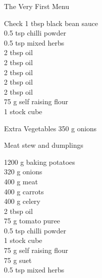 \begin{menu}{The Very First Menu}
      \par\vfil %
      \vfil\clearpage %
      \begin{shoppinglist}{Check}
      1 tbsp black bean sauce \\ 
      0.5 tsp chilli powder \\ 
      0.5 tsp mixed herbs \\ 
      2 tbsp oil \\ 
      2 tbsp oil \\ 
      2 tbsp oil \\ 
      2 tbsp oil \\ 
      2 tbsp oil \\ 
      75 g self raising flour \\ 
      1  stock cube \\ 
      \end{shoppinglist}%
      \begin{shoppinglist}{Extra Vegetables}
      350 g onions \\ 
      \end{shoppinglist}%
      \par\vfil %
    \vfil\clearpage
  
    \begin{recipe}{2}{Meat stew and dumplings}%
    
	
	
		\begin{ingredients}
		1200 g baking potatoes  \\
	320 g onions  \\
	400 g meat  \\
	400 g carrots  \\
	400 g celery  \\
	2 tbsp oil  \\
	75 g tomato puree  \\
	0.5 tsp chilli powder  \\
	1  stock cube  \\
	75 g self raising flour  \\
	75 g suet  \\
	0.5 tsp mixed herbs  \\
	
		\end{ingredients}
	

\end{recipe}
\end{menu}
